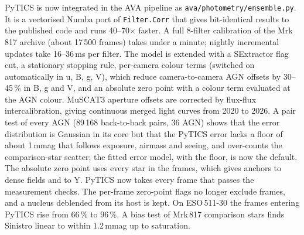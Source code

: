 PyTICS is now integrated in the AVA pipeline as
\texttt{ava/photometry/ensemble.py}.  It is a vectorised Numba port of \texttt{Filter.Corr} that
gives bit-identical results to the published code and runs 40--70$\times$ faster.  A full
8-filter calibration of the Mrk\,817 archive (about 17\,500 frames) takes under a minute; nightly
incremental updates take 16--36\,ms per filter.  The model is extended with a SExtractor flag cut, a
stationary stopping rule, per-camera colour terms (switched on automatically in u, B, g, V), which reduce
camera-to-camera AGN offsets by 30--45\,\% in B, g and V, and an absolute zero point with a colour term
evaluated at the AGN colour.  MuSCAT3 aperture offsets are corrected by flux-flux intercalibration, giving
continuous merged light curves from 2020 to 2026.  A pair test of every AGN (89\,168 back-to-back pairs, 36 AGN) shows that
the error distribution is Gaussian in its core but that the PyTICS error lacks a floor of about 1\,mmag that
follows exposure, airmass and seeing, and over-counts the comparison-star scatter; the fitted error model,
with the floor, is now the default.  The absolute zero point uses every star in the frames, which gives
anchors to dense fields and to Y.  PyTICS now takes every frame that passes the measurement checks. The per-frame zero-point flags no longer
exclude frames, and a nucleus deblended from its host is kept. On ESO\,511-30 the frames entering PyTICS rise
from 66\,\% to 96\,\%. A bias test of Mrk\,817 comparison stars finds Sinistro linear to within 1.2\,mmag up to
saturation.

